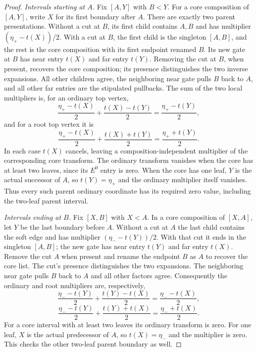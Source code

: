 \begin{proof}
\emph{Intervals starting at $A$.}
Fix $[A,Y]$ with $B<Y$. For a core composition of $[A,Y]$, write $X$
for its first boundary after $A$. There are exactly two parent
presentations. Without a cut at $B$, its first child contains $A,B$ and
has multiplier $(\eta_+-t(X))/2$. With a cut at $B$, the first child is
the singleton $[A,B]$, and the rest is the core composition with its
first endpoint renamed $B$. Its new gate at $B$ has near entry $t(X)$
and far entry $t(Y)$. Removing the cut at $B$, when present, recovers
the core composition; its presence distinguishes the two inverse
expansions. All other children agree, the neighboring near gate pulls
$B$ back to $A$, and all other far entries are the stipulated pullbacks.
The sum of the two local multipliers is, for an ordinary top vertex,
\begin{equation}\label{aspr:first-ordinary}
\frac{\eta_+-t(X)}2+\frac{t(X)-t(Y)}2
=\frac{\eta_+-t(Y)}2,
\end{equation}
and for a root top vertex it is
\begin{equation}\label{aspr:first-root}
\frac{\eta_+-t(X)}2+\frac{t(X)+t(Y)}2
=\frac{\eta_++t(Y)}2.
\end{equation}
In each case $t(X)$ cancels, leaving a composition-independent multiplier
of the corresponding core transform. The ordinary transform vanishes
when the core has at least two leaves, since its $E^0$ entry is zero.
When the core has one leaf, $Y$ is the actual successor of $A$, so
$t(Y)=\eta_+$ and the ordinary multiplier itself vanishes. Thus every
such parent ordinary coordinate has its required zero value, including
the two-leaf parent interval.

\emph{Intervals ending at $B$.}
Fix $[X,B]$ with $X<A$. In a core composition of $[X,A]$, let $Y$
be the last boundary before $A$. Without a cut at $A$ the last child
contains the soft edge and has multiplier $(\eta_--t(Y))/2$.
With that cut it ends in the singleton $[A,B]$; the new gate has near
entry $t(Y)$ and far entry $t(X)$. Remove the cut $A$ when present
and rename the endpoint $B$ as $A$ to recover the core list. The cut's
presence distinguishes the two expansions. The neighboring near gate
pulls $B$ back to $A$ and all other factors agree. Consequently the
ordinary and root multipliers are, respectively,
\begin{equation}\label{aspr:last-ordinary}
\frac{\eta_--t(Y)}2+\frac{t(Y)-t(X)}2
=\frac{\eta_--t(X)}2,
\end{equation}
\begin{equation}\label{aspr:last-root}
\frac{\eta_--t(Y)}2+\frac{t(Y)+t(X)}2
=\frac{\eta_-+t(X)}2.
\end{equation}
For a core interval with at least two leaves its ordinary transform is
zero. For one leaf, $X$ is the actual predecessor of $A$, so
$t(X)=\eta_-$ and the multiplier is zero. This checks the other
two-leaf parent boundary as well.


\end{proof}
